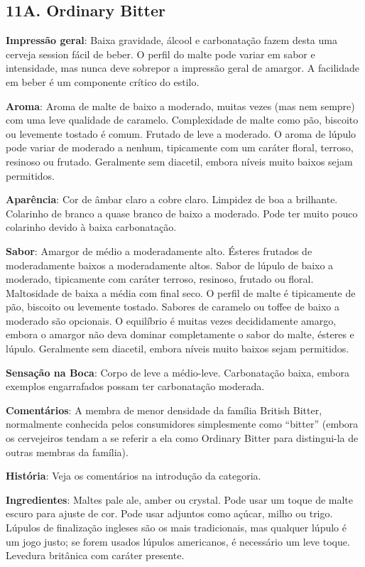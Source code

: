 \subsection*{11A. Ordinary Bitter}
\textbf{Impressão geral}: Baixa gravidade, álcool e carbonatação fazem desta uma cerveja session fácil de beber. O perfil do malte pode variar em sabor e intensidade, mas nunca deve sobrepor a impressão geral de amargor. A facilidade em beber é um componente crítico do estilo.

\textbf{Aroma}: Aroma de malte de baixo a moderado, muitas vezes (mas nem sempre) com uma leve qualidade de caramelo. Complexidade de malte como pão, biscoito ou levemente tostado é comum. Frutado de leve a moderado. O aroma de lúpulo pode variar de moderado a nenhum, tipicamente com um caráter floral, terroso, resinoso ou frutado. Geralmente sem diacetil, embora níveis muito baixos sejam permitidos.

\textbf{Aparência}: Cor de âmbar claro a cobre claro. Limpidez de boa a brilhante. Colarinho de branco a quase branco de baixo a moderado. Pode ter muito pouco colarinho devido à baixa carbonatação.

\textbf{Sabor}: Amargor de médio a moderadamente alto. Ésteres frutados de moderadamente baixos a moderadamente altos. Sabor de lúpulo de baixo a moderado, tipicamente com caráter terroso, resinoso, frutado ou floral. Maltosidade de baixa a média com final seco. O perfil de malte é tipicamente de pão, biscoito ou levemente tostado. Sabores de caramelo ou toffee de baixo a moderado são opcionais. O equilíbrio é muitas vezes decididamente amargo, embora o amargor não deva dominar completamente o sabor do malte, ésteres e lúpulo. Geralmente sem diacetil, embora níveis muito baixos sejam permitidos.

\textbf{Sensação na Boca}: Corpo de leve a médio-leve. Carbonatação baixa, embora exemplos engarrafados possam ter carbonatação moderada.

\textbf{Comentários}: A membra de menor densidade da família British Bitter, normalmente conhecida pelos consumidores simplesmente como “bitter” (embora os cervejeiros tendam a se referir a ela como Ordinary Bitter para distingui-la de outras membras da família).

\textbf{História}: Veja os comentários na introdução da categoria.

\textbf{Ingredientes}: Maltes pale ale, amber ou crystal. Pode usar um toque de malte escuro para ajuste de cor. Pode usar adjuntos como açúcar, milho ou trigo. Lúpulos de finalização ingleses são os mais tradicionais, mas qualquer lúpulo é um jogo justo; se forem usados lúpulos americanos, é necessário um leve toque. Levedura britânica com caráter presente.

